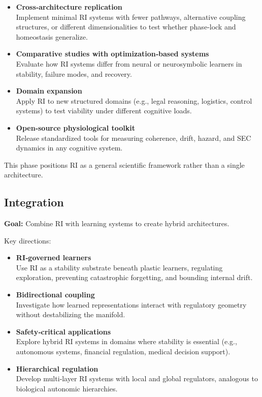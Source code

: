 \documentclass[12pt,a4paper]{report}
\begin{document}
\begin{itemize}
\item \textbf{Cross‑architecture replication} \\
  Implement minimal RI systems with fewer pathways, alternative coupling structures, or different dimensionalities to test whether phase‑lock and homeostasis generalize.

\item \textbf{Comparative studies with optimization‑based systems} \\
  Evaluate how RI systems differ from neural or neurosymbolic learners in stability, failure modes, and recovery.

\item \textbf{Domain expansion} \\
  Apply RI to new structured domains (e.g., legal reasoning, logistics, control systems) to test viability under different cognitive loads.

\item \textbf{Open‑source physiological toolkit} \\
  Release standardized tools for measuring coherence, drift, hazard, and SEC dynamics in any cognitive system.
\end{itemize}

This phase positions RI as a general scientific framework rather than a single architecture.

\subsection{Integration}

\textbf{Goal:} Combine RI with learning systems to create hybrid architectures.

Key directions:

\begin{itemize}
\item \textbf{RI‑governed learners} \\
  Use RI as a stability substrate beneath plastic learners, regulating exploration, preventing catastrophic forgetting, and bounding internal drift.

\item \textbf{Bidirectional coupling} \\
  Investigate how learned representations interact with regulatory geometry without destabilizing the manifold.

\item \textbf{Safety‑critical applications} \\
  Explore hybrid RI systems in domains where stability is essential (e.g., autonomous systems, financial regulation, medical decision support).

\item \textbf{Hierarchical regulation} \\
  Develop multi‑layer RI systems with local and global regulators, analogous to biological autonomic hierarchies.
\end{itemize}
\end{document}
